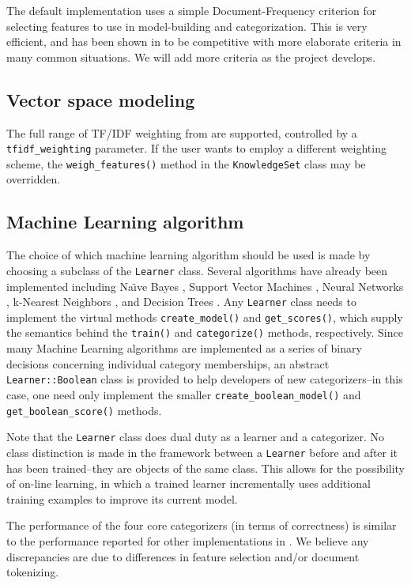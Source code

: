 \documentclass[a4paper,twocolumn]{article}
\begin{document}
The default implementation uses a simple Document-Frequency criterion
for selecting features to use in model-building and categorization.
This is very efficient, and has been shown in \cite{yang:97} to be
competitive with more elaborate criteria in many common situations.
We will add more criteria as the project develops.

\subsection{Vector space modeling}
The full range of TF/IDF weighting from \cite{salton:88} are
supported, controlled by a \texttt{tfidf\_weighting} parameter.  If
the user wants to employ a different weighting scheme, the
\texttt{weigh\_features()} method in the \texttt{KnowledgeSet} class
may be overridden.

\subsection{Machine Learning algorithm}
The choice of which machine learning algorithm should be used is made
by choosing a subclass of the \texttt{Learner} class.  Several
algorithms have already been implemented including Na\"\i ve Bayes
\cite{lewis:98}, Support Vector Machines \cite{scholkopf:99}
\cite{cortes:95}, Neural Networks \cite{calvo:01} \cite{yang:99},
k-Nearest Neighbors \cite{yang:99}, and Decision Trees
\cite{quinlan:89}.  Any \texttt{Learner} class needs to implement the
virtual methods \texttt{create\_model()} and \texttt{get\_scores()},
which supply the semantics behind the \texttt{train()} and
\texttt{categorize()} methods, respectively.  Since many Machine
Learning algorithms are implemented as a series of binary decisions
concerning individual category memberships, an abstract
\texttt{Learner::Boolean} class is provided to help developers of new
categorizers--in this case, one need only implement the smaller
\texttt{create\_boolean\_model()} and \texttt{get\_boolean\_score()}
methods.

Note that the \texttt{Learner} class does dual duty as a learner and a
categorizer.  No class distinction is made in the framework between a
\texttt{Learner} before and after it has been trained--they are
objects of the same class.  This allows for the possibility of on-line
learning, in which a trained learner incrementally uses additional
training examples to improve its current model.

The performance of the four core categorizers (in terms of
correctness) is similar to the performance reported for other
implementations in \cite{yang:99}.  We believe any discrepancies are
due to differences in feature selection and/or document tokenizing.
\end{document}
